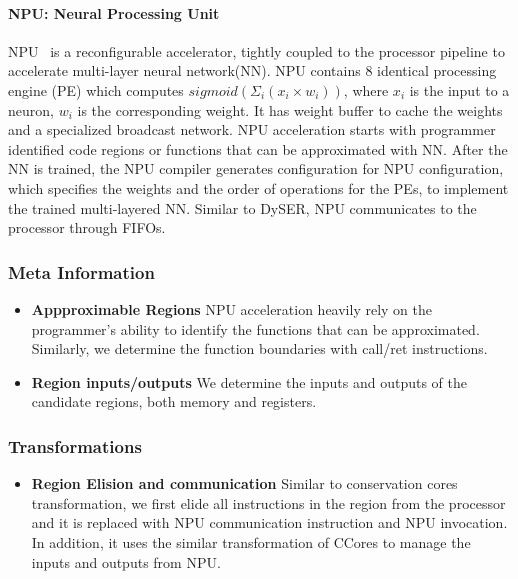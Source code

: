 \paragraph{NPU: Neural Processing Unit}
NPU~\cite{npu} is a reconfigurable accelerator, tightly
coupled to the processor pipeline to accelerate multi-layer neural
network(NN). NPU contains 8 identical processing engine (PE) which
computes $sigmoid(\Sigma_i(x_i \times w_i))$, where $x_i$ is the input
to a neuron, $w_i$ is the corresponding weight. It has weight buffer
to cache the weights and a specialized broadcast network.
NPU acceleration starts with programmer
identified code regions or functions that can be approximated with NN.
After the NN is trained, the NPU compiler generates configuration for
NPU configuration, which
specifies the weights and the order of operations for the PEs, to implement
the trained multi-layered NN.  Similar
to DySER, NPU communicates to the processor through FIFOs.

\subsubsection*{Meta Information}
\begin{itemize}
  \item \textbf{Appproximable Regions}
    NPU acceleration heavily rely on the programmer's ability to
    identify the functions that can be approximated. Similarly, we
    determine the function boundaries with call/ret instructions.
  \item \textbf{Region inputs/outputs}
    We determine the inputs and outputs of the candidate regions, both memory
    and registers.
\end{itemize}

\subsubsection*{Transformations}
\begin{itemize}
  \item \textbf{Region Elision and communication}
   Similar to conservation cores transformation, we first elide all
   instructions in the region from the processor and it is replaced
   with NPU communication instruction and NPU invocation. In addition,
   it uses the similar transformation of CCores to manage the inputs and outputs
   from NPU.
\end{itemize}

\fi


